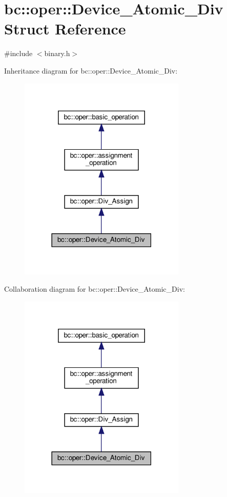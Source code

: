 \hypertarget{structbc_1_1oper_1_1Device__Atomic__Div}{}\section{bc\+:\+:oper\+:\+:Device\+\_\+\+Atomic\+\_\+\+Div Struct Reference}
\label{structbc_1_1oper_1_1Device__Atomic__Div}


{\ttfamily \#include $<$binary.\+h$>$}



Inheritance diagram for bc\+:\+:oper\+:\+:Device\+\_\+\+Atomic\+\_\+\+Div\+:\nopagebreak
\begin{figure}[H]
\begin{center}
\leavevmode
\includegraphics[width=225pt]{structbc_1_1oper_1_1Device__Atomic__Div__inherit__graph}
\end{center}
\end{figure}


Collaboration diagram for bc\+:\+:oper\+:\+:Device\+\_\+\+Atomic\+\_\+\+Div\+:\nopagebreak
\begin{figure}[H]
\begin{center}
\leavevmode
\includegraphics[width=225pt]{structbc_1_1oper_1_1Device__Atomic__Div__coll__graph}
\end{center}
\end{figure}
